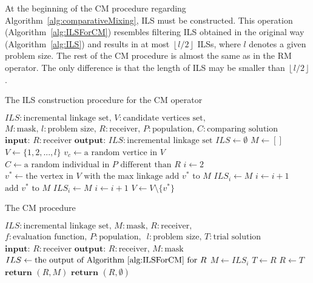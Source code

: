 At the beginning of the CM procedure regarding Algorithm~\ref{alg:comparativeMixing}, ILS must be constructed. This operation (Algorithm~\ref{alg:ILSForCM}) resembles filtering ILS obtained in the original way (Algorithm~\ref{alg:ILS}) and results in at most $\left \lfloor{l/2}\right \rfloor$ ILSs, where $l$ denotes a given problem size. The rest of the CM procedure is almost the same as in the RM operator. The only difference is that the length of ILS may be smaller than $\left \lfloor{l/2}\right \rfloor$.

\begin{algorithm}
	\caption{The ILS construction procedure for the CM operator}
	\label{alg:ILSForCM}
	\begin{algorithmic}[1]
		\State $ILS: \text{incremental linkage set, } V: \text{candidate vertices set,}$
		\State $M: \text{mask, } l: \text{problem size, } R: \text{receiver,}$
		\State $P: \text{population, } C: \text{comparing solution}$
		\State $\textbf{input: } R: \text{receiver}$
		\State $\textbf{output: } ILS: \text{incremental linkage set}$
		\State $ILS \gets \emptyset$
		\State $M \gets []$
		\State $V \gets \{1, 2, ..., l\}$
		\State $v_c \gets \text{a random vertice in } V$
		\State {}
		\State $C \gets \text{a random individual in $P$ different than $R$}$
		\State $i \gets 2$
			\State $v^* \gets \text{the vertex in $V$ with the max linkage}$
					\State $\text{add $v^*$ to $M$}$
					\State $ILS_i \gets M$
					\State $i \gets i + 1$
				\EndIf
			\Else
					\State $\text{add $v^*$ to $M$}$
					\State $ILS_i \gets M$
					\State $i \gets i + 1$
				\EndIf
			\EndIf
			\State $V \gets V \setminus \{v^*\}$
		\EndWhile
	\end{algorithmic}
\end{algorithm}

\begin{algorithm}
	\caption{The CM procedure}
	\label{alg:comparativeMixing}
	\begin{algorithmic}[1]
		\State $ILS: \text{incremental linkage set, } M: \text{mask, } R: \text{receiver,}$
		\State $f: \text{evaluation function, } P: \text{population, }$
		\State $l: \text{problem size, } T: \text{trial solution}$
		\State {}
		\State {}
		\State $\textbf{input: } R: \text{receiver}$
		\State $\textbf{output: } R: \text{receiver, } M: \text{mask}$
		\State $ILS \gets \text{the output of Algorithm~\ref{alg:ILSForCM} for } R$
			\State $M \gets ILS_i$
				\State $T \gets R$
				\State {}
					\State $R \gets T$
					\State $\textbf{return } (R, M)$
				\EndIf
			\EndIf
		\EndFor
		\State $\textbf{return } (R, \emptyset)$
	\end{algorithmic}
\end{algorithm}

